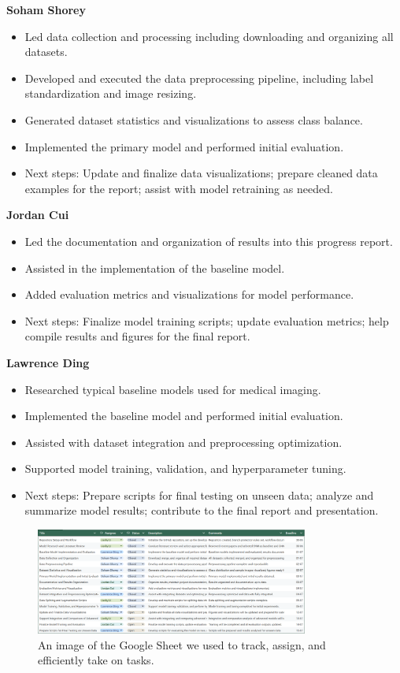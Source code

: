 \documentclass{article} %
\begin{document}
\textbf{Soham Shorey}
\begin{itemize}
\item Led data collection and processing including downloading and organizing all datasets.
\item Developed and executed the data preprocessing pipeline, including label standardization and image resizing.
\item Generated dataset statistics and visualizations to assess class balance.
\item Implemented the primary model and performed initial evaluation.
\item Next steps: Update and finalize data visualizations; prepare cleaned data examples for the report; assist with model retraining as needed.
\end{itemize}

\textbf{Jordan Cui}
\begin{itemize}
\item Led the documentation and organization of results into this progress report.
\item Assisted in the implementation of the baseline model.
\item Added evaluation metrics and visualizations for model performance.
\item Next steps: Finalize model training scripts; update evaluation metrics; help compile results and figures for the final report.
\end{itemize}

\textbf{Lawrence Ding}
\begin{itemize}
\item Researched typical baseline models used for medical imaging.
\item Implemented the baseline model and performed initial evaluation.
\item Assisted with dataset integration and preprocessing optimization.
\item Supported model training, validation, and hyperparameter tuning.
\item Next steps: Prepare scripts for final testing on unseen data; analyze and summarize model results; contribute to the final report and presentation.
\end{itemize}

\begin{figure}[h]
\begin{center}
\includegraphics[width=0.8\textwidth]{Figs/google_sheet_tracking.png}
\end{center}
\caption{An image of the Google Sheet we used to track, assign, and efficiently take on tasks.}
\end{figure}
\end{document}

